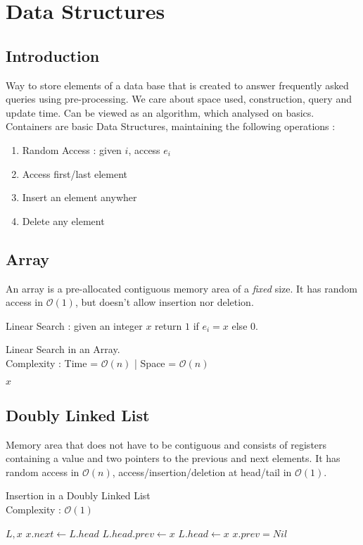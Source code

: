 \documentclass{cours}
\begin{document}
\section{Data Structures}
\subsection{Introduction}
Way to store elements of a data base that is created to answer frequently asked queries using pre-processing.
We care about space used, construction, query and update time.
Can be viewed as an algorithm, which analysed on basics.
Containers are basic Data Structures, maintaining the following operations : 
\begin{enumerate}
    \item Random Access : given $i$, access $e_{i}$
    \item Access first/last element
    \item Insert an element anywher
    \item Delete any element
\end{enumerate} 

\subsection{Array}
An array is a pre-allocated contiguous memory area of a \emph{fixed} size. It has random access in $\mathcal{O}(1)$, but doesn't allow insertion nor deletion.

Linear Search : given an integer $x$ return $1$ if $e_{i} = x$ else 0.
\begin{algorithm}
    \caption{Linear Search in an Array. \\ Complexity : Time = $\mathcal{O}(n)$ | Space = $\mathcal{O}(n)$}
    \begin{algorithmic}
        \Input
        $x$
        \EndInput
    \end{algorithmic}
\end{algorithm}

\subsection{Doubly Linked List}
Memory area that does not have to be contiguous and consists of registers containing a value and two pointers to the previous and next elements.
It has random access in $\mathcal{O}(n)$, access/insertion/deletion at head/tail in $\mathcal{O}(1)$.
\begin{algorithm}
    \caption{Insertion in a Doubly Linked List \\ Complexity : $\mathcal{O}(1)$}
    \begin{algorithmic}
        \Input
        $ L, x$
        \EndInput
        \State $x.next \gets L.head$ 
            \State $L.head.prev \gets x$
        \EndIf
        \State $L.head \gets x$
        \State $x.prev = Nil$
    \end{algorithmic}
\end{algorithm}
\end{document}
